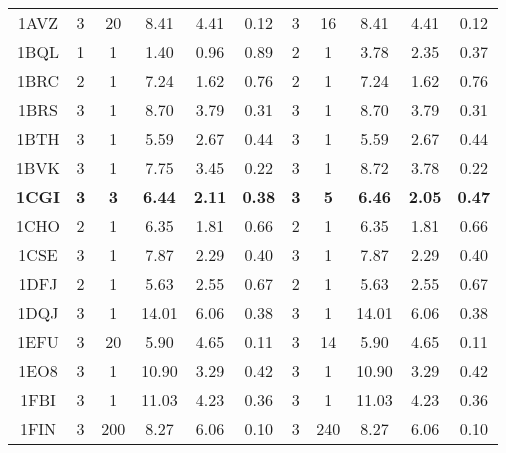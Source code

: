 \begin{longtable}{c c c c c c|c c c c c}
 {\tiny 1AVZ}&{\tiny 3}&{\tiny 20}&{\tiny 8.41}&{\tiny 4.41}&{\tiny 0.12}&{\tiny 3}&{\tiny 16}&{\tiny 8.41}&{\tiny 4.41}&{\tiny 0.12}\\ 
 {\tiny 1BQL}&{\tiny 1}&{\tiny 1}&{\tiny 1.40}&{\tiny 0.96}&{\tiny 0.89}&{\tiny 2}&{\tiny 1}&{\tiny 3.78}&{\tiny 2.35}&{\tiny 0.37}\\ 
 {\tiny 1BRC}&{\tiny 2}&{\tiny 1}&{\tiny 7.24}&{\tiny 1.62}&{\tiny 0.76}&{\tiny 2}&{\tiny 1}&{\tiny 7.24}&{\tiny 1.62}&{\tiny 0.76}\\ 
 {\tiny 1BRS}&{\tiny 3}&{\tiny 1}&{\tiny 8.70}&{\tiny 3.79}&{\tiny 0.31}&{\tiny 3}&{\tiny 1}&{\tiny 8.70}&{\tiny 3.79}&{\tiny 0.31}\\ 
 {\tiny 1BTH}&{\tiny 3}&{\tiny 1}&{\tiny 5.59}&{\tiny 2.67}&{\tiny 0.44}&{\tiny 3}&{\tiny 1}&{\tiny 5.59}&{\tiny 2.67}&{\tiny 0.44}\\ 
 {\tiny 1BVK}&{\tiny 3}&{\tiny 1}&{\tiny 7.75}&{\tiny 3.45}&{\tiny 0.22}&{\tiny 3}&{\tiny 1}&{\tiny 8.72}&{\tiny 3.78}&{\tiny 0.22}\\ 
 \textbf{\tiny 1CGI}&\textbf{\tiny 3}&\textbf{\tiny 3}&\textbf{\tiny 6.44}&\textbf{\tiny 2.11}&\textbf{\tiny 0.38}&\textbf{\tiny 3}&\textbf{\tiny 5}&\textbf{\tiny 6.46}&\textbf{\tiny 2.05}&\textbf{\tiny 0.47}\\ 
 {\tiny 1CHO}&{\tiny 2}&{\tiny 1}&{\tiny 6.35}&{\tiny 1.81}&{\tiny 0.66}&{\tiny 2}&{\tiny 1}&{\tiny 6.35}&{\tiny 1.81}&{\tiny 0.66}\\ 
 {\tiny 1CSE}&{\tiny 3}&{\tiny 1}&{\tiny 7.87}&{\tiny 2.29}&{\tiny 0.40}&{\tiny 3}&{\tiny 1}&{\tiny 7.87}&{\tiny 2.29}&{\tiny 0.40}\\ 
 {\tiny 1DFJ}&{\tiny 2}&{\tiny 1}&{\tiny 5.63}&{\tiny 2.55}&{\tiny 0.67}&{\tiny 2}&{\tiny 1}&{\tiny 5.63}&{\tiny 2.55}&{\tiny 0.67}\\ 
 {\tiny 1DQJ}&{\tiny 3}&{\tiny 1}&{\tiny 14.01}&{\tiny 6.06}&{\tiny 0.38}&{\tiny 3}&{\tiny 1}&{\tiny 14.01}&{\tiny 6.06}&{\tiny 0.38}\\ 
 {\tiny 1EFU}&{\tiny 3}&{\tiny 20}&{\tiny 5.90}&{\tiny 4.65}&{\tiny 0.11}&{\tiny 3}&{\tiny 14}&{\tiny 5.90}&{\tiny 4.65}&{\tiny 0.11}\\ 
 {\tiny 1EO8}&{\tiny 3}&{\tiny 1}&{\tiny 10.90}&{\tiny 3.29}&{\tiny 0.42}&{\tiny 3}&{\tiny 1}&{\tiny 10.90}&{\tiny 3.29}&{\tiny 0.42}\\ 
 {\tiny 1FBI}&{\tiny 3}&{\tiny 1}&{\tiny 11.03}&{\tiny 4.23}&{\tiny 0.36}&{\tiny 3}&{\tiny 1}&{\tiny 11.03}&{\tiny 4.23}&{\tiny 0.36}\\ 
 {\tiny 1FIN}&{\tiny 3}&{\tiny 200}&{\tiny 8.27}&{\tiny 6.06}&{\tiny 0.10}&{\tiny 3}&{\tiny 240}&{\tiny 8.27}&{\tiny 6.06}&{\tiny 0.10}\\ 

\end{longtable}
